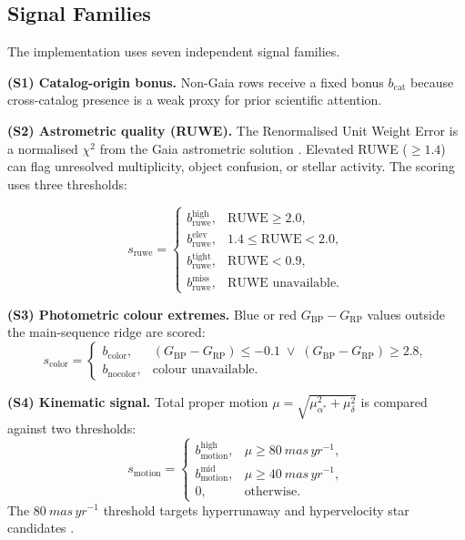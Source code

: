 \documentclass[12pt]{elsarticle}
\begin{document}
\subsection{Signal Families}
\label{sec:signals}

The implementation uses seven independent signal families.

\medskip\noindent\textbf{(S1) Catalog-origin bonus.} Non-Gaia rows receive a fixed bonus $b_{\mathrm{cat}}$ because cross-catalog presence is a weak proxy for prior scientific attention.

\medskip\noindent\textbf{(S2) Astrometric quality (RUWE).} The Renormalised Unit Weight Error is a normalised $\chi^2$ from the Gaia astrometric solution \citep{Fabricius2021}. Elevated RUWE ($\ge 1.4$) can flag unresolved multiplicity, object confusion, or stellar activity. The scoring uses three thresholds:

\[
s_{\mathrm{ruwe}} =
\begin{cases}
b_{\mathrm{ruwe}}^{\mathrm{high}},  & \mathrm{RUWE} \ge 2.0, \\[2pt]
b_{\mathrm{ruwe}}^{\mathrm{elev}},   & 1.4 \le \mathrm{RUWE} < 2.0, \\[2pt]
b_{\mathrm{ruwe}}^{\mathrm{tight}}, & \mathrm{RUWE} < 0.9, \\[2pt]
b_{\mathrm{ruwe}}^{\mathrm{miss}},  & \text{RUWE unavailable}.
\end{cases}
\]

\medskip\noindent\textbf{(S3) Photometric colour extremes.} Blue or red $G_{\mathrm{BP}} - G_{\mathrm{RP}}$ values outside the main-sequence ridge are scored:
\[
s_{\mathrm{color}} =
\begin{cases}
b_{\mathrm{color}}, & (G_{\mathrm{BP}}-G_{\mathrm{RP}}) \le -0.1 \;\lor\; (G_{\mathrm{BP}}-G_{\mathrm{RP}}) \ge 2.8, \\
b_{\mathrm{nocolor}}, & \text{colour unavailable}.
\end{cases}
\]

\medskip\noindent\textbf{(S4) Kinematic signal.} Total proper motion $\mu = \sqrt{\mu_{\alpha^*}^2 + \mu_\delta^2}$ is compared against two thresholds:
\[
s_{\mathrm{motion}} =
\begin{cases}
b_{\mathrm{motion}}^{\mathrm{high}}, & \mu \ge \SI{80}{mas\,yr^{-1}}, \\[2pt]
b_{\mathrm{motion}}^{\mathrm{mid}},  & \mu \ge \SI{40}{mas\,yr^{-1}}, \\[2pt]
0, & \text{otherwise}.
\end{cases}
\]
The $\SI{80}{mas\,yr^{-1}}$ threshold targets hyperrunaway and hypervelocity star candidates \citep{Brown2015}.
\end{document}
